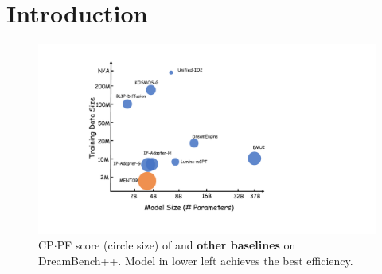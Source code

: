 
\section{Introduction} 
\label{sec:introduction}

\begin{figure} 
    \centering
    \vspace{-5mm}
    \includegraphics[width=\linewidth]{figures/Figure.pdf}
    \caption{CP$\cdotp$PF score (circle size) of \textcolor[HTML]{ED8B50}{\textbf{\model}} and \textcolor[HTML]{5A76A9}{\textbf{other baselines}} on DreamBench++. Model in lower left achieves the best efficiency.}
    \label{fig:SnapKV}
    \vspace{-0.3cm}
\end{figure}



